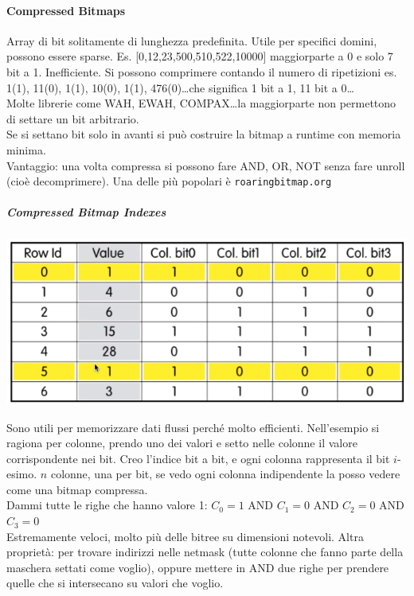 \documentclass[10pt]{book}
\begin{document}
\paragraph{Compressed Bitmaps} Array di bit solitamente di lunghezza predefinita. Utile per specifici domini, possono essere sparse. Es. [0,12,23,500,510,522,10000] maggiorparte a 0 e solo 7 bit a 1. Inefficiente. Si possono comprimere contando il numero di ripetizioni es. 1(1), 11(0), 1(1), 10(0), 1(1), 476(0)\ldots che significa 1 bit a 1, 11 bit a 0\ldots\\
Molte librerie come WAH, EWAH, COMPAX\ldots la maggiorparte non permettono di settare un bit arbitrario.\\
Se si settano bit solo in avanti si può costruire la bitmap a runtime con memoria minima.\\
Vantaggio: una volta compressa si possono fare AND, OR, NOT senza fare unroll (cioè decomprimere). Una delle più popolari è \texttt{roaringbitmap.org}
\subparagraph{Compressed Bitmap Indexes} 
\begin{center}
	\includegraphics[scale=0.7]{comprbitmapindex.png}
\end{center}
Sono utili per memorizzare dati flussi perché molto efficienti. Nell'esempio si ragiona per colonne, prendo uno dei valori e setto nelle colonne il valore corrispondente nei bit. Creo l'indice bit a bit, e ogni colonna rappresenta il bit $i$-esimo. $n$ colonne, una per bit, se vedo ogni colonna indipendente la posso vedere come una bitmap compressa.\\
Dammi tutte le righe che hanno valore 1: $C_0 = 1$ AND $C_1 = 0$ AND $C_2 = 0$ AND $C_3 = 0$\\
Estremamente veloci, molto più delle bitree su dimensioni notevoli. Altra proprietà: per trovare indirizzi nelle netmask (tutte colonne che fanno parte della maschera settati come voglio), oppure mettere in AND due righe per prendere quelle che si intersecano su valori che voglio.
\end{document}
